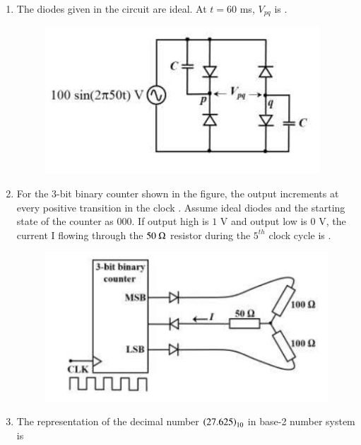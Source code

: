 \documentclass[journal,12pt,onecolumn]{IEEEtran}
\theoremstyle{remark}
\begin{document}
\begin{enumerate}
    \hfill{}
    
    \item The diodes given in the circuit are ideal. At $t=60$ ms, $V_{pq}$  is \underline{\hspace{2cm}}.
    \begin{figure}[H]
        \centering
        \includegraphics[width=0.5\columnwidth]{q16.png}
        \caption*{}
        \label{fig:q16}
    \end{figure}
    
    \hfill{}

    \item For the 3-bit binary counter shown in the figure, the output increments at every positive transition in the clock . Assume ideal diodes and the starting state of the counter as $000$. If output high is $1$ V and output low is $0$ V, the current I  flowing through the $50~\ohm$ resistor during the $5^{th}$ clock cycle is  \underline{\hspace{2cm}}.
    \begin{figure}[H]
        \centering
        \includegraphics[width=0.6\columnwidth]{q17.png}
        \caption*{}
        \label{fig:q17}
    \end{figure}
    
    \hfill{}
    
    \item The representation of the decimal number $\left(27.625\right)_{10}$ in base-2 number system is
    
    \hfill{}
    \begin{enumerate}
    \end{enumerate}


\end{enumerate}
\end{document}
